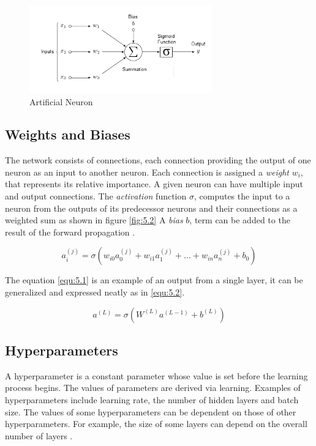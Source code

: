 \documentclass[12pt, a4paper]{report}
\begin{document}
\begin{figure}[!htbp]
    \centering
    \includegraphics[width=0.7\textwidth]{artificial_neuron.png}
    \caption[Artificial Neuron]{Artificial Neuron}
    \label{fig:5.2}
\end{figure}

\subsection{Weights and Biases}
The network consists of connections, each connection providing the output of one neuron as an input to another neuron. Each connection is assigned a \emph{weight} $w_i$, that represents its relative importance. A given neuron can have multiple input and output connections. The \emph{activation} function $\sigma$, computes the input to a neuron from the outputs of its predecessor neurons and their connections as a weighted sum as shown in figure \eqref{fig:5.2} A \emph{bias} $b$, term can be added to the result of the forward propagation \cite{wiki:anns}.

\begin{equation}
    \label{equ:5.1}
    a_i^{(j)} = \sigma(w_{i0}a_0^{(j)} + w_{i1}a_1^{(j)} + \hdots + w_{in}a_n^{(j)} + b_0)
\end{equation}

The equation \eqref{equ:5.1} is an example of an output from a single layer, it can be generalized and expressed neatly as in \eqref{equ:5.2}.

\begin{equation}
    \label{equ:5.2}
    a^{(L)} = \sigma(W^{(L)}a^{(L-1)} + b^{(L)})
\end{equation}

\subsection{Hyperparameters}
A hyperparameter is a constant parameter whose value is set before the learning process begins. The values of parameters are derived via learning. Examples of hyperparameters include learning rate, the number of hidden layers and batch size. The values of some hyperparameters can be dependent on those of other hyperparameters. For example, the size of some layers can depend on the overall number of layers \cite{wiki:anns}.
\end{document}
